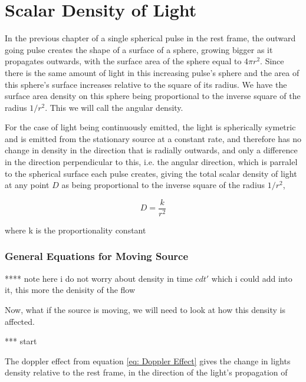\section{Scalar Density of Light}\label{sect: Field Scalar Density}

In the previous chapter of a single spherical pulse in the rest frame, the outward going pulse creates the shape of a surface of a sphere, growing bigger as it propagates outwards, with the surface area of the sphere equal to $4 \pi r^2$.
Since there is the same amount of light in this increasing pulse's sphere and the area of this sphere's surface increases relative to the square of its radius.
We have the surface area density on this sphere being proportional to the inverse square of the radius $1/r^2$. This we will call the angular density.

For the case of light being continuously emitted, the light is spherically symetric and is emitted from the stationary source at a constant rate, and therefore has no change in density in the direction that is radially outwards, and only a difference in the direction perpendicular to this, i.e. the angular direction, which is parralel to the spherical surface each pulse creates, giving the total scalar density of light at any point $D$ as being proportional to the inverse square of the radius $1/r^2$,

\begin{equation}
	D = \frac{k}{r^2}
\end{equation}

where k is the proportionality constant

\subsubsection{General Equations for Moving Source}\label{subsubsect: General Equations for Moving Source 0}

**** note here i do not worry about density in time $cdt'$ which i could add into it, this more the denisity of the flow

Now, what if the source is moving, we will need to look at how this density is affected.

*** start

The doppler effect from equation \eqref{eq: Doppler Effect} gives the change in lights density relative to the rest frame, in the direction of the light's propagation of


